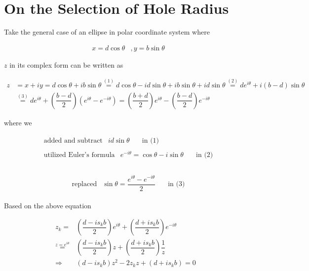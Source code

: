 \section{On the Selection of Hole Radius}\label{app:why_r_is_one}
Take the general case of an ellipse in polar coordinate system where

\begin{equation*}
    \begin{matrix}
    x = d \cos\theta & , 
    y = b \sin\theta
    \end{matrix}
\end{equation*}

$z$ in its complex form can be written as 

\begin{align*}
    z & =  x + iy = d \cos\theta + i b \sin\theta \overset{(1)}{=} d \cos\theta - i d \sin\theta + i b \sin\theta + i d \sin\theta \overset{(2)}{=} d e^{i\theta} + i(b-d)\sin\theta & \\
    & \overset{(3)}{=} d e^{i\theta} + \left( \dfrac{b -d}{2} \right) (e^{i\theta} - e^{-i\theta}) = \left(\dfrac{b+d}{2} \right) e^{i\theta} - \left( \dfrac{b-d}{2} \right) e^{-i\theta}
\end{align*}

where we 

\begin{align*}
    \begin{matrix}
    \text{added and subtract} & i d \sin\theta \quad & \text{in (1)}
    \end{matrix} \\
    \begin{matrix}
    \text{utilized Euler's formula} & e^{-i\theta} = \cos \theta - i \sin \theta \quad & \text{in (2)}
    \end{matrix} \\
\end{align*}

\begin{align*}
    \begin{matrix}
    \text{replaced} & \sin\theta = \dfrac{e^{i\theta} - e^{-i\theta}}{2} \quad & \text{in (3)}
    \end{matrix}
\end{align*}

Based on the above equation \cite{Jong1987}

\begin{align*}
    z_k = & \left(\dfrac{d - i s_k b}{2} \right) e^{i\theta} + \left( \dfrac{d + i s_k b}{2} \right) e^{-i\theta} & \\
    \overset{z = e^{i\theta}}{=} & \left(\dfrac{d - i s_k b}{2} \right) z + \left( \dfrac{d + i s_k b}{2} \right) \dfrac{1}{z} & \\
    \Rightarrow & (d - i s_k b) z^2  - 2 z_k z + (d + i s_k b)= 0
\end{align*}


